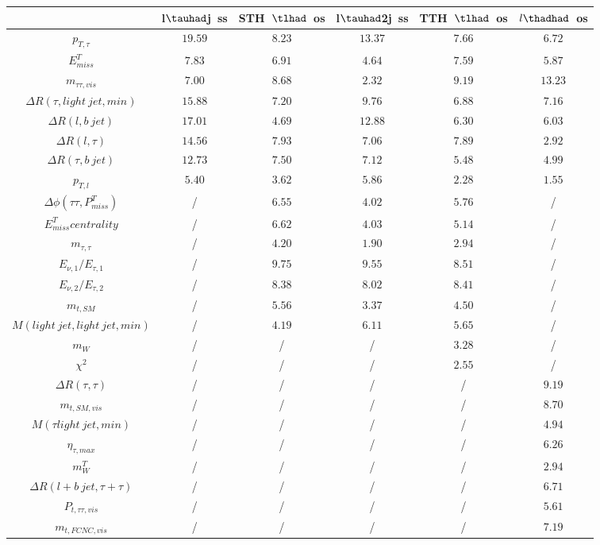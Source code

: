 \centering
\begin{tabular}{|c|c|c|c|c|c|} \hline
 & l$\tauhad$j~ss & STH~$\tlhad$~os & l$\tauhad$2j~ss & TTH~$\tlhad$~os & $l\thadhad$~os\\\hline
$p_{T,\tau }$ & $19.59$ & $8.23$ & $13.37$ & $7.66$ & $6.72$\\\hline
$E^{T}_{miss}$ & $7.83$ & $6.91$ & $4.64$ & $7.59$ & $5.87$\\\hline
$m_{\tau \tau ,vis}$ & $7.00$ & $8.68$ & $2.32$ & $9.19$ & $13.23$\\\hline
$\Delta R(\tau ,light~jet,min)$ & $15.88$ & $7.20$ & $9.76$ & $6.88$ & $7.16$\\\hline
$\Delta R(l,b~jet)$ & $17.01$ & $4.69$ & $12.88$ & $6.30$ & $6.03$\\\hline
$\Delta R(l,\tau )$ & $14.56$ & $7.93$ & $7.06$ & $7.89$ & $2.92$\\\hline
$\Delta R(\tau ,b~jet)$ & $12.73$ & $7.50$ & $7.12$ & $5.48$ & $4.99$\\\hline
$p_{T,l}$ & $5.40$ & $3.62$ & $5.86$ & $2.28$ & $1.55$\\\hline
$\Delta\phi(\tau \tau ,P^{T}_{miss})$ &  / & $6.55$ & $4.02$ & $5.76$ &  /\\\hline
$E^{T}_{miss} centrality$ &  / & $6.62$ & $4.03$ & $5.14$ &  /\\\hline
$m_{\tau ,\tau }$ &  / & $4.20$ & $1.90$ & $2.94$ &  /\\\hline
$E_{\nu,1}/E_{\tau ,1}$ &  / & $9.75$ & $9.55$ & $8.51$ &  /\\\hline
$E_{\nu,2}/E_{\tau ,2}$ &  / & $8.38$ & $8.02$ & $8.41$ &  /\\\hline
$m_{t,SM}$ &  / & $5.56$ & $3.37$ & $4.50$ &  /\\\hline
$M(light~jet,light~jet,min)$ &  / & $4.19$ & $6.11$ & $5.65$ &  /\\\hline
$m_{W}$ &  / &  / &  / & $3.28$ &  /\\\hline
$\chi^{2}$ &  / &  / &  / & $2.55$ &  /\\\hline
$\Delta R(\tau ,\tau )$ &  / &  / &  / &  / & $9.19$\\\hline
$m_{t,SM,vis}$ &  / &  / &  / &  / & $8.70$\\\hline
$M(\tau  light~jet,min)$ &  / &  / &  / &  / & $4.94$\\\hline
$\eta_{\tau ,max}$ &  / &  / &  / &  / & $6.26$\\\hline
$m^{T}_{W}$ &  / &  / &  / &  / & $2.94$\\\hline
$\Delta R(l+b~jet,\tau +\tau )$ &  / &  / &  / &  / & $6.71$\\\hline
$P_{t,\tau \tau ,vis}$ &  / &  / &  / &  / & $5.61$\\\hline
$m_{t,FCNC,vis}$ &  / &  / &  / &  / & $7.19$\\\hline
\end{tabular}
